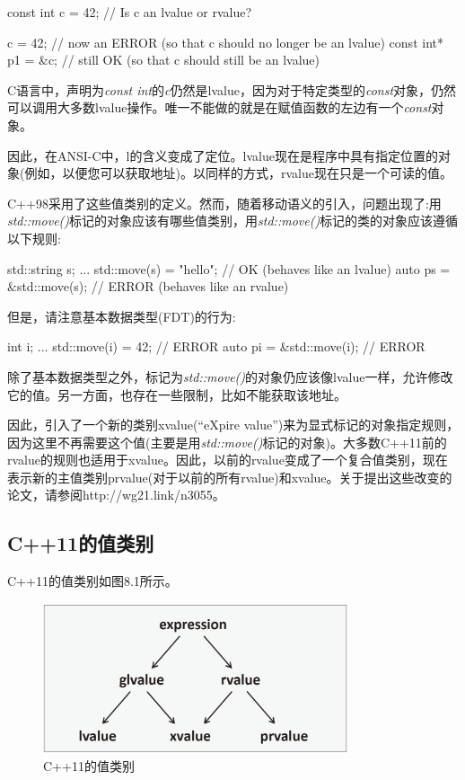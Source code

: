 \begin{cppcode}
const int c = 42; // Is c an lvalue or rvalue?

c = 42; // now an ERROR (so that c should no longer be an lvalue)
const int* p1 = &c; // still OK (so that c should still be an lvalue)
\end{cppcode}

C语言中，声明为\textit{const int}的\textit{c}仍然是lvalue，因为对于特定类型的\textit{const}对象，仍然可以调用大多数lvalue操作。唯一不能做的就是在赋值函数的左边有一个\textit{const}对象。

因此，在ANSI-C中，l的含义变成了定位。lvalue现在是程序中具有指定位置的对象(例如，以便您可以获取地址)。以同样的方式，rvalue现在只是一个可读的值。

C++98采用了这些值类别的定义。然而，随着移动语义的引入，问题出现了:用\textit{std::move()}标记的对象应该有哪些值类别，用\textit{std::move()}标记的类的对象应该遵循以下规则:

\begin{cppcode}
std::string s;
...
std::move(s) = "hello"; // OK (behaves like an lvalue)
auto ps = &std::move(s); // ERROR (behaves like an rvalue)
\end{cppcode}

但是，请注意基本数据类型(FDT)的行为:

\begin{cppcode}
int i;
...
std::move(i) = 42; // ERROR
auto pi = &std::move(i); // ERROR
\end{cppcode}

除了基本数据类型之外，标记为\textit{std::move()}的对象仍应该像lvalue一样，允许修改它的值。另一方面，也存在一些限制，比如不能获取该地址。

因此，引入了一个新的类别xvalue(“eXpire value”)来为显式标记的对象指定规则，因为这里不再需要这个值(主要是用\textit{std::move()}标记的对象)。大多数C++11前的rvalue的规则也适用于xvalue。因此，以前的rvalue变成了一个复合值类别，现在表示新的主值类别prvalue(对于以前的所有rvalue)和xvalue。关于提出这些改变的论文，请参阅http://wg21.link/n3055。

\subsection{C++11的值类别}

C++11的值类别如图8.1所示。

\begin{figure}
	\includegraphics[width=0.8\textwidth]{part1/ch8/images/1}
	\caption{C++11的值类别}
\end{figure}

